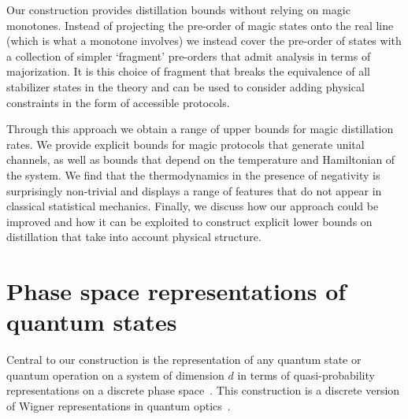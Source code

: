 \documentclass[pra,
aps,
twocolumn,
superscriptaddress,
groupedaddress,
nofootinbib,
reprint
]{revtex4-1}
\begin{document}
Our construction provides distillation bounds without relying on magic monotones. Instead of projecting the pre-order of magic states onto the real line (which is what a monotone involves) we instead cover the pre-order of states with a collection of simpler `fragment' pre-orders that admit analysis in terms of majorization. It is this choice of fragment that breaks the equivalence of all stabilizer states in the theory and can be used to consider adding physical constraints in the form of accessible protocols.

Through this approach we obtain a range of upper bounds for magic distillation rates. We provide explicit bounds for magic protocols that generate unital channels, as well as bounds that depend on the temperature and Hamiltonian of the system. We find that the thermodynamics in the presence of negativity is surprisingly non-trivial and displays a range of features that do not appear in classical statistical mechanics. 
Finally, we discuss how our approach could be improved and how it can be exploited to construct explicit lower bounds on distillation that take into account physical structure.

\section{Phase space representations of quantum states}
\label{sec:ps}

Central to our construction is the representation of any quantum state or quantum operation on a system of dimension $d$ in terms of quasi-probability representations on a discrete phase space~\cite{Ferrie_2008}. This construction is a discrete version of Wigner representations in quantum optics~\cite{Wigner_1932, Vourdas_2004}.
\end{document}
